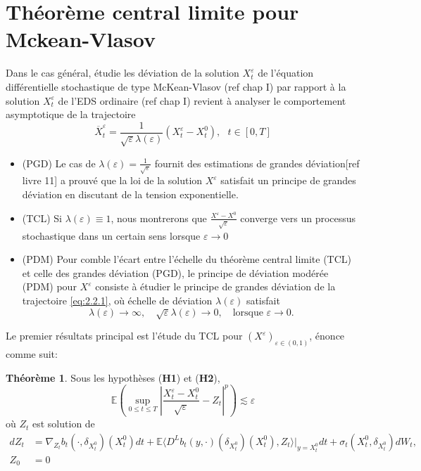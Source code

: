 \documentclass[12pt,a4paper,twoside,fleqn]{book}%
\theoremstyle{definition}
\newtheorem{thm}[dfn]{Théorème}
\theoremstyle{lemme}
\numberwithin{equation}{section}
\begin{document}
\section{Théorème central limite pour Mckean-Vlasov}
Dans le cas général, étudie les déviation de la solution $X_t^{\varepsilon}$ de l'équation différentielle stochastique de type McKean-Vlasov (ref chap I) par rapport à la solution $X_t^\varepsilon$ de l'EDS ordinaire (ref chap I) revient à analyser le comportement asymptotique de la trajectoire 
\begin{equation}\label{}
	\overline{X}_t^\varepsilon=\frac{1}{\sqrt{\varepsilon}\lambda(\varepsilon)}\left(X_t^\varepsilon-X_t^0\right), \text{                  }t\in[0,T]
\end{equation} 
\begin{itemize}
	\item (PGD) Le cas de $\lambda(\varepsilon)=\frac{1}{\sqrt{\varepsilon}}$ fournit des estimations de grandes déviation[ref livre 11] a prouvé que la loi de la solution $X^\varepsilon$ satisfait un principe de grandes déviation en discutant de la tension exponentielle.

\item (TCL) Si $\lambda(\varepsilon)\equiv1$, nous montrerons que $\frac{X^\varepsilon-X^0}{\sqrt{\varepsilon}}$ converge vers un processus stochastique dans un certain sens lorsque $\varepsilon\to0$
\item (PDM) Pour comble l'écart entre l'échelle du théorème central limite (TCL) et celle des grandes déviation (PGD), le principe de déviation modérée (PDM) pour $X^\varepsilon$ consiste à étudier le principe de grandes déviation de la trajectoire \ref{eq:2.2.1}, où échelle de déviation $\lambda(\varepsilon)$ satisfait
\begin{equation}\label{1.2.3}
	\lambda(\varepsilon) \to \infty, \quad \sqrt{\varepsilon} \lambda(\varepsilon) \to 0, \quad \text{lorsque } \varepsilon \to 0.
\end{equation}
\end{itemize}

Le premier résultats principal est l'étude du TCL pour $(X^\varepsilon)_{\varepsilon\in(0,1)}$, énonce comme suit:
\begin{thm}\label{thm:2.2.1}
	Sous les hypothèses (\textbf{H1}) et (\textbf{H2}),
	\begin{equation}
		\mathbb{E}\left(\sup_{0\leq t \leq T}\left|\frac{X_t^\varepsilon-X_t^0}{\sqrt{\varepsilon}}-Z_t\right|^p
		\right)\lesssim \varepsilon
	\end{equation}
	où $Z_t$ est solution de 
	\begin{equation}\label{eq:2.2.4}
		\begin{aligned}
	dZ_t &= \nabla_{Z_t} b_t (\cdot, \delta_{X_t^0}) (X_t^0) dt + \mathbb{E} \langle D^L b_t (y, \cdot) (\delta_{X_t^0}) (X_t^0), Z_t\rangle |_{y = X_t^0} dt + \sigma_t (X_t^0, \delta_{X_t^0}) dW_t,\\
	Z_0&=0
	\end{aligned}
	\end{equation}
\end{thm}
\end{document}
